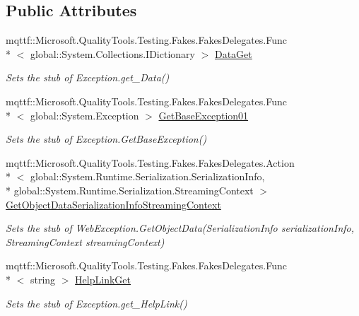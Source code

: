 \subsection*{Public Attributes}
\begin{DoxyCompactItemize}
\item 
mqttf\-::\-Microsoft.\-Quality\-Tools.\-Testing.\-Fakes.\-Fakes\-Delegates.\-Func\\*
$<$ global\-::\-System.\-Collections.\-I\-Dictionary $>$ \hyperlink{class_system_1_1_net_1_1_fakes_1_1_stub_web_exception_a9db0a26b927d0fc21c33b96996c095a8}{Data\-Get}
\begin{DoxyCompactList}\small\item\em Sets the stub of Exception.\-get\-\_\-\-Data()\end{DoxyCompactList}\item 
mqttf\-::\-Microsoft.\-Quality\-Tools.\-Testing.\-Fakes.\-Fakes\-Delegates.\-Func\\*
$<$ global\-::\-System.\-Exception $>$ \hyperlink{class_system_1_1_net_1_1_fakes_1_1_stub_web_exception_ad1b04e0dece251e651365df80499376c}{Get\-Base\-Exception01}
\begin{DoxyCompactList}\small\item\em Sets the stub of Exception.\-Get\-Base\-Exception()\end{DoxyCompactList}\item 
mqttf\-::\-Microsoft.\-Quality\-Tools.\-Testing.\-Fakes.\-Fakes\-Delegates.\-Action\\*
$<$ global\-::\-System.\-Runtime.\-Serialization.\-Serialization\-Info, \\*
global\-::\-System.\-Runtime.\-Serialization.\-Streaming\-Context $>$ \hyperlink{class_system_1_1_net_1_1_fakes_1_1_stub_web_exception_a268fec0fb73fc0498c682b75a3d5c9eb}{Get\-Object\-Data\-Serialization\-Info\-Streaming\-Context}
\begin{DoxyCompactList}\small\item\em Sets the stub of Web\-Exception.\-Get\-Object\-Data(\-Serialization\-Info serialization\-Info, Streaming\-Context streaming\-Context)\end{DoxyCompactList}\item 
mqttf\-::\-Microsoft.\-Quality\-Tools.\-Testing.\-Fakes.\-Fakes\-Delegates.\-Func\\*
$<$ string $>$ \hyperlink{class_system_1_1_net_1_1_fakes_1_1_stub_web_exception_a3fb41aa1b9850d149540a2e549209e1b}{Help\-Link\-Get}
\begin{DoxyCompactList}\small\item\em Sets the stub of Exception.\-get\-\_\-\-Help\-Link()\end{DoxyCompactList}\item 

\end{DoxyCompactItemize}
